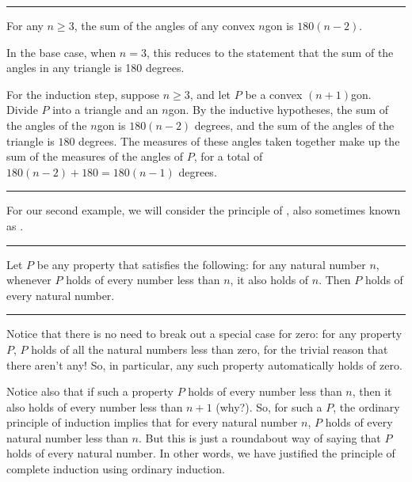 \documentclass[letterpaper,10pt,english]{sphinxmanual}
\begin{document}
\bigskip\hrule\bigskip


\sphinxAtStartPar
{} For any \(n \geq 3\), the sum of the angles of any convex \(n\)\sphinxhyphen{}gon is \(180(n - 2)\).

\sphinxAtStartPar
{} In the base case, when \(n = 3\), this reduces to the statement that the sum of the angles in any triangle is 180 degrees.

\sphinxAtStartPar
For the induction step, suppose \(n \geq 3\), and let \(P\) be a convex \((n+1)\)\sphinxhyphen{}gon. Divide \(P\) into a triangle and an \(n\)\sphinxhyphen{}gon. By the inductive hypotheses, the sum of the angles of the \(n\)\sphinxhyphen{}gon is \(180(n-2)\) degrees, and the sum of the angles of the triangle is \(180\) degrees. The measures of these angles taken together make up the sum of the measures of the angles of \(P\), for a total of \(180(n-2) + 180 = 180(n-1)\) degrees.


\bigskip\hrule\bigskip


\sphinxAtStartPar
For our second example, we will consider the principle of , also sometimes known as .


\bigskip\hrule\bigskip


\sphinxAtStartPar
{} Let \(P\) be any property that satisfies the following: for any natural number \(n\), whenever \(P\) holds of every number less than \(n\), it also holds of \(n\). Then \(P\) holds of every natural number.


\bigskip\hrule\bigskip


\sphinxAtStartPar
Notice that there is no need to break out a special case for zero: for any property \(P\), \(P\) holds of all the natural numbers less than zero, for the trivial reason that there aren’t any! So, in particular, any such property automatically holds of zero.

\sphinxAtStartPar
Notice also that if such a property \(P\) holds of every number less than \(n\), then it also holds of every number less than \(n + 1\) (why?). So, for such a \(P\), the ordinary principle of induction implies that for every natural number \(n\), \(P\) holds of every natural number less than \(n\). But this is just a roundabout way of saying that \(P\) holds of every natural number. In other words, we have justified the principle of complete induction using ordinary induction.
\end{document}
